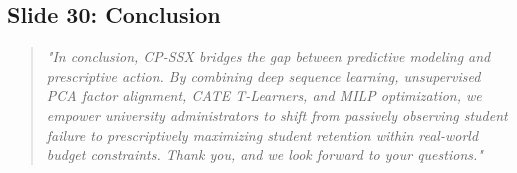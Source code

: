 \documentclass[11pt, a4paper]{article}
\begin{document}
\subsection{Slide 30: Conclusion}
\begin{quote}\small \itshape
"In conclusion, CP-SSX bridges the gap between predictive modeling and prescriptive action. By combining deep sequence learning, unsupervised PCA factor alignment, CATE T-Learners, and MILP optimization, we empower university administrators to shift from passively observing student failure to prescriptively maximizing student retention within real-world budget constraints. Thank you, and we look forward to your questions."
\end{quote}
\end{document}
